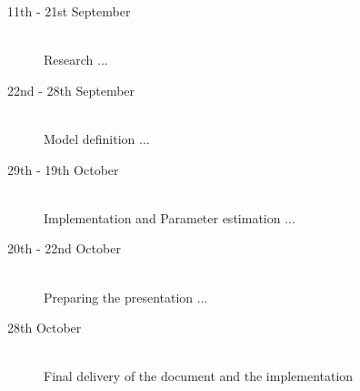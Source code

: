 \documentclass[a4paper, 11pt]{scrartcl}
\begin{document}
\begin{description}
	\item[11th - 21st September]\-\\
	Research ...
	\item[22nd - 28th September]\-\\
	Model definition ...
	\item[29th - 19th October]\-\\
	Implementation and Parameter estimation ...
	\item[20th - 22nd October]\-\\
	Preparing the presentation ...
	\item[28th October]\-\\
	Final delivery of the document and the implementation
\end{description}
\end{document}
